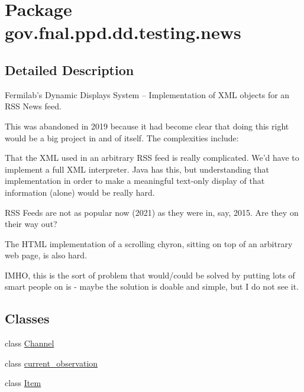 \hypertarget{namespacegov_1_1fnal_1_1ppd_1_1dd_1_1testing_1_1news}{\section{Package gov.\-fnal.\-ppd.\-dd.\-testing.\-news}
\label{namespacegov_1_1fnal_1_1ppd_1_1dd_1_1testing_1_1news}
}


\subsection{Detailed Description}
Fermilab's Dynamic Displays System -- Implementation of X\-M\-L objects for an R\-S\-S News feed. 

This was abandoned in 2019 because it had become clear that doing this right would be a big project in and of itself. The complexities include\-: 
\begin{DoxyItemize}
\item That the X\-M\-L used in an arbitrary R\-S\-S feed is really complicated. We'd have to implement a full X\-M\-L interpreter. Java has this, but understanding that implementation in order to make a meaningful text-\/only display of that information (alone) would be really hard. 
\item R\-S\-S Feeds are not as popular now (2021) as they were in, say, 2015. Are they on their way out? 
\item The H\-T\-M\-L implementation of a scrolling chyron, sitting on top of an arbitrary web page, is also hard. 
\end{DoxyItemize}

I\-M\-H\-O, this is the sort of problem that would/could be solved by putting lots of smart people on is -\/ maybe the solution is doable and simple, but I do not see it. \subsection*{Classes}
\begin{DoxyCompactItemize}
\item 
class \hyperlink{classgov_1_1fnal_1_1ppd_1_1dd_1_1testing_1_1news_1_1Channel}{Channel}
\item 
class \hyperlink{classgov_1_1fnal_1_1ppd_1_1dd_1_1testing_1_1news_1_1current__observation}{current\-\_\-observation}
\item 
class \hyperlink{classgov_1_1fnal_1_1ppd_1_1dd_1_1testing_1_1news_1_1Item}{Item}
\end{DoxyCompactItemize}
